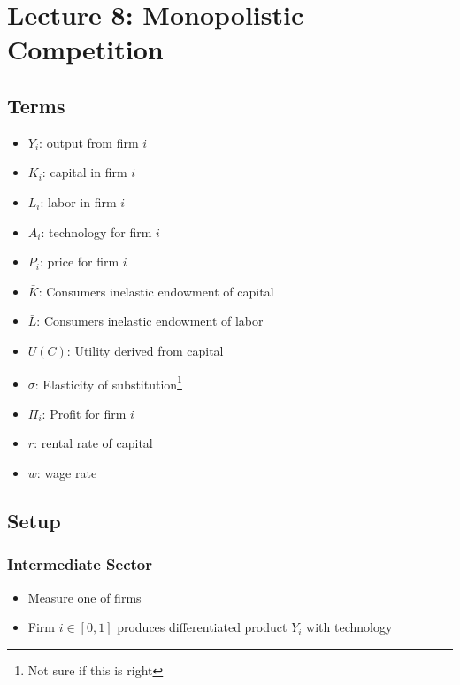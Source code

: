 \documentclass[10pt]{article}
\begin{document}

\section{Lecture 8: Monopolistic Competition}

\subsection{Terms}

\begin{itemize}
    \item $Y_i$: output from firm $i$
    \item $K_i$: capital in firm $i$
    \item $L_i$: labor in firm $i$
    \item $A_i$: technology for firm $i$
    \item $P_i$: price for firm $i$
    \item $\bar{K}$: Consumers inelastic endowment of capital 
    \item $\bar{L}$: Consumers inelastic endowment of labor
    \item $U(C)$: Utility derived from capital 
    \item $\sigma$: Elasticity of substitution\footnote{\color{red} Not sure if this is right} 
    \item $\Pi_i$: Profit for firm $i$
    \item $r$: rental rate of capital
    \item $w$: wage rate
\end{itemize}

\subsection{Setup}

\subsubsection{Intermediate Sector}

\begin{itemize}
    \item Measure one of firms
    \item Firm $i \in[0,1]$ produces differentiated product $Y_i$ with technology
\end{itemize}
\end{document}
